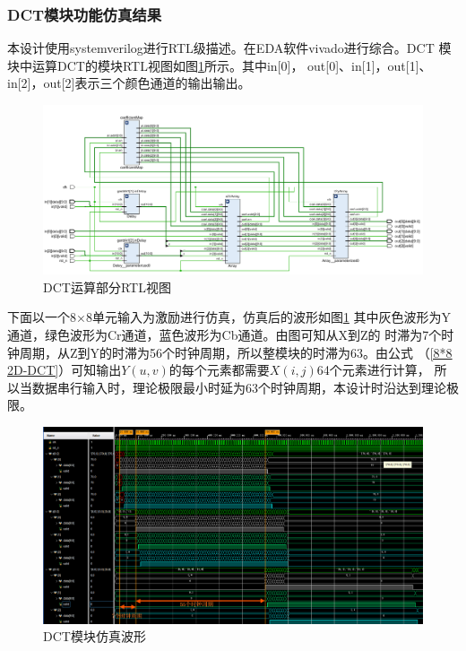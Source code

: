 \documentclass{article}
\numberwithin {equation}{section}
\begin{document}
\begin{spacing}{1.25}
        \subsubsection{DCT模块功能仿真结果}
        \vspace{1em}
        本设计使用systemverilog进行RTL级描述。在EDA软件vivado进行综合。DCT
        模块中运算DCT的模块RTL视图如图\ref{DCTSchematice}所示。其中in[0]，
        out[0]、in[1]，out[1]、in[2]，out[2]表示三个颜色通道的输出输出。
        \begin{figure}[H]
          \centering
          \includegraphics[scale=0.5]{./pictures/DCTSchematice.png}
          \caption{DCT运算部分RTL视图}
          \label{DCTSchematice}
        \end{figure}
      下面以一个8×8单元输入为激励进行仿真，仿真后的波形如图\ref{DCTSchematice}
      其中灰色波形为Y通道，绿色波形为Cr通道，蓝色波形为Cb通道。由图可知从X到Z的
      时滞为7个时钟周期，从Z到Y的时滞为56个时钟周期，所以整模块的时滞为63。由公式
      （\ref{8*8 2D-DCT}）可知输出$Y(u,v)$的每个元素都需要$X(i,j)$64个元素进行计算，
      所以当数据串行输入时，理论极限最小时延为63个时钟周期，本设计时沿达到理论极限。
        \begin{figure}[H]
          \centering
          \includegraphics[scale=0.375]{./pictures/DCT模块仿真.png}
          \caption{DCT模块仿真波形}
          \label{DCTSimulationWave}
        \end{figure}


\end{spacing}
\end{document}
